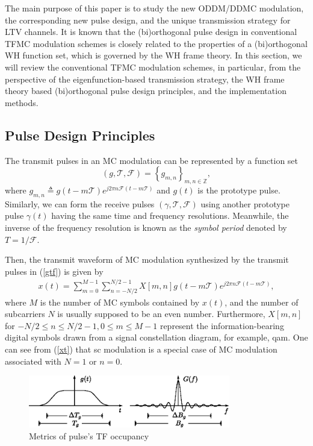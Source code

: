 \documentclass[journal]{IEEEtran}
\begin{document}
The main purpose of this paper is to study the new ODDM/DDMC modulation, the corresponding new pulse design, and the unique transmission strategy for LTV channels.
It is known that the (bi)orthogonal pulse design in conventional TFMC modulation schemes is closely related to the properties of a (bi)orthogonal WH function set, which is governed by the WH frame theory\cite{tff}. In this section, we will review the conventional TFMC modulation schemes, in particular, from the perspective of the eigenfunction-based transmission strategy, the WH frame theory based (bi)orthogonal pulse design principles, and the implementation methods.

\subsection{Pulse Design Principles}
The transmit pulses in an MC modulation can be represented by a function set\cite{tff}
\begin{equation}\label{gtf}
  \left(g,\mathcal T, \mathcal F\right)=\left\{g_{m,n}\right\}_{m,n\in \mathbb Z},
\end{equation}
where $g_{m,n}\triangleq g(t-m\mathcal T)e^{j2\pi n \mathcal F (t-m\mathcal T)}$ and $g(t)$ is the prototype pulse.
Similarly, we can form the receive pulses $\left(\gamma,\mathcal T, \mathcal F\right)$ using another prototype pulse $\gamma(t)$ having the same time and frequency resolutions. Meanwhile, the inverse of the frequency resolution is known as the \emph{symbol period} denoted by $T=1/\mathcal F$.

Then, the transmit waveform of MC modulation synthesized by the transmit pulses in (\ref{gtf}) is given by
\begin{align}\label{xt}
  x(t)=\sum_{m=0}^{M-1}\sum_{n=-N/2}^{N/2-1} X[m,n]g(t-m\mathcal T)e^{j2\pi n \mathcal F (t-m\mathcal T)},
\end{align}
where $M$ is the number of MC symbols contained by $x(t)$, and the number of subcarriers $N$ is usually supposed to be an even number. Furthermore,
$X[m,n]$ for $-N/2\le n \le N/2-1, 0\le m \le M-1$ represent the information-bearing digital symbols drawn from a signal constellation diagram, for example, \ac{qam}.
One can see from (\ref{xt}) that \ac{sc} modulation is a special case of MC modulation associated with $N=1$ or $n=0$.


\begin{figure}
  \centering
  \includegraphics[width=8.8cm]{dtdf}
  \caption{Metrics of pulse's TF occupancy}
  \label{dtdf}
\end{figure}
\end{document}
